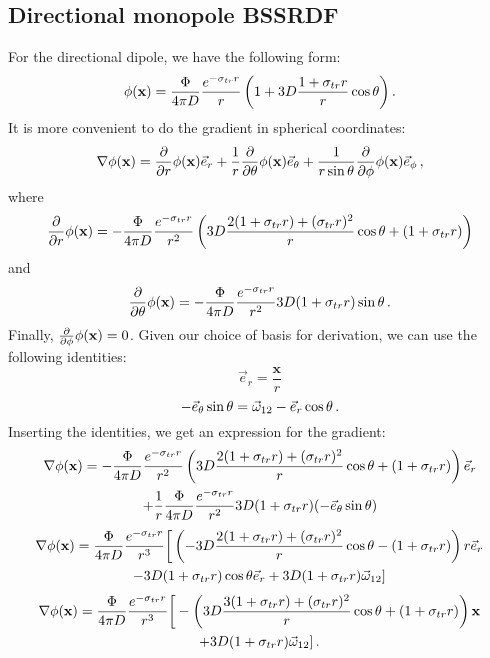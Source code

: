 \documentclass[10pt,a4paper]{article}
\begin{document}
\subsection{Directional monopole BSSRDF}

For the directional dipole, we have the following form:
$$
{\phi}(\mathbf{x}) = \frac{\Phi}{4\pi D} \frac{e^{- \sigma_{tr} r}}{ r} \left( 1
    + 3 D \frac{1 + \sigma_{tr} r}{r} \cos \theta \right).
$$
It is more convenient to do the gradient in spherical coordinates:
$$
\nabla {\phi}(\mathbf{x}) = \frac{\partial}{\partial r} {\phi}(\mathbf{x}) \vec{e}_r + \frac{1}{r} \frac{\partial}{\partial \theta} {\phi}(\mathbf{x}) \vec{e}_\theta +  \frac{1}{r \sin \theta}  \frac{\partial}{\partial \phi} {\phi}(\mathbf{x}) \vec{e}_\phi \, ,
$$
where
$$
 \frac{\partial}{\partial r} {\phi}(\mathbf{x}) = - \frac{\Phi}{4\pi D} \frac{e^{- \sigma_{tr} r}}{ r^2} \left( 3D \frac{2 (1 + \sigma_{tr} r)  + (\sigma_{tr} r)^2}{r} \cos\theta + (1 + \sigma_{tr} r) \right)
$$
and
$$
 \frac{\partial}{\partial \theta} {\phi}(\mathbf{x}) = - \frac{\Phi}{4\pi D} \frac{e^{- \sigma_{tr} r}}{ r^2} 3D (1 + \sigma_{tr} r) \sin\theta \, .
$$
Finally, $\frac{\partial}{\partial \phi} {\phi}(\mathbf{x}) = 0$. Given our choice of basis for derivation, we can use the following identities:
$$
\vec{e}_r = \frac{\mathbf{x}}{r}
$$
$$
- \vec{e}_\theta \sin\theta = \vec{\omega}_{12} - \vec{e}_r \cos\theta \, .
$$
Inserting the identities, we get an expression for the gradient:
\begin{multline*}
\nabla {\phi}(\mathbf{x}) = - \frac{\Phi}{4\pi D} \frac{e^{- \sigma_{tr} r}}{ r^2} \left( 3D \frac{2 (1 + \sigma_{tr} r)  + (\sigma_{tr} r)^2}{r} \cos\theta + (1 + \sigma_{tr} r) \right) \vec{e}_r \\ + \frac{1}{r}  \frac{\Phi}{4\pi D} \frac{e^{- \sigma_{tr} r}}{ r^2} 3D (1 + \sigma_{tr} r) (- \vec{e}_\theta \sin\theta)
\end{multline*}
\begin{multline*}
\nabla {\phi}(\mathbf{x}) =\frac{\Phi}{4\pi D} \frac{e^{- \sigma_{tr} r}}{ r^3} \bigg[ \left( -3D \frac{2 (1 + \sigma_{tr} r)  + (\sigma_{tr} r)^2}{r} \cos\theta - (1 + \sigma_{tr} r) \right) r \vec{e}_r  \\-  3D (1 + \sigma_{tr} r) \cos\theta \vec{e}_r + 3D (1 + \sigma_{tr} r) \vec{\omega}_{12} ]
\end{multline*}
\begin{multline*}
\nabla {\phi}(\mathbf{x}) =\frac{\Phi}{4\pi D} \frac{e^{- \sigma_{tr} r}}{ r^3} \bigg[ -\left( 3D \frac{3 (1 + \sigma_{tr} r)  + (\sigma_{tr} r)^2}{r} \cos\theta + (1 + \sigma_{tr} r) \right) \mathbf{x}  \\ + 3D (1 + \sigma_{tr} r) \vec{\omega}_{12} ] \, .
\end{multline*}
\end{document}
